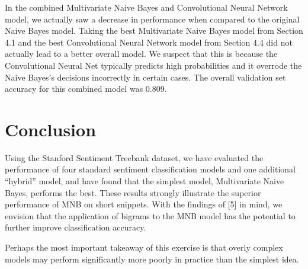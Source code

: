 \documentclass[11pt]{article}
\begin{document}
In the combined Multivariate Naive Bayes and Convolutional Neural Network model, we actually saw a decrease in performance when compared to the original Naive Bayes model.  Taking the best Multivariate Naive Bayes model from Section 4.1 and the best Convolutional Neural Network model from Section 4.4 did not actually lead to a better overall model.  We suspect that this is because the Convolutional Neural Net typically predicts high probabilities and it overrode the Naive Bayes's decisions incorrectly in certain cases.  The overall validation set accuracy for this combined model was 0.809.


\section{Conclusion}
Using the Stanford Sentiment Treebank dataset, we have evaluated the performance of four standard sentiment classification models and one additional ``hybrid'' model, and have found that the simplest model, Multivariate Naive Bayes, performs the best. These results strongly illustrate the superior performance of MNB on short snippets. With the findings of [5] in mind, we envision that the application of bigrams to the MNB model has the potential to further improve classification accuracy.

Perhaps the most important takeaway of this exercise is that overly complex models may perform significantly more poorly in practice than the simplest idea.  



\nocite{*}

\end{document}
